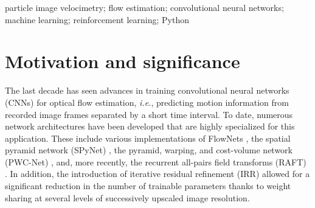 \documentclass[a4paper,fleqn]{cas-dc}
\begin{document}
\begin{keywords}
particle image velocimetry; flow estimation; convolutional neural networks; machine learning; reinforcement learning; Python
\end{keywords}

\maketitle

\section{Motivation and significance\label{sec:introduction}}

The last decade has seen advances in training convolutional neural networks (CNNs) for optical flow estimation, \textit{i.e.}, predicting motion information from recorded image frames separated by a short time interval. To date, numerous network architectures have been developed that are highly specialized for this application. These include various implementations of FlowNets \citep{dosovitskiy2015flownet, ilg2017flownet, hui2018liteflownet}, the spatial pyramid network (SPyNet) \cite{ranjan2017optical}, the pyramid, warping, and cost-volume network (PWC-Net) \cite{sun2018pwc}, and, more recently, the recurrent all-pairs field transforms (RAFT) \cite{teed2020raft}. In addition, the introduction of iterative residual refinement (IRR) \cite{hur2019iterative} allowed for a significant reduction in the number of trainable parameters thanks to weight sharing at several levels of successively upscaled image resolution.
\end{document}
